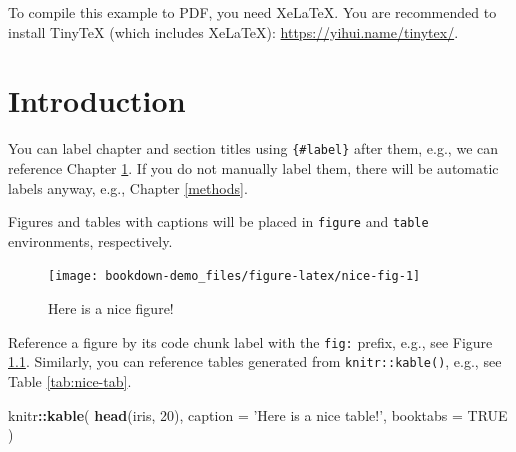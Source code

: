 \documentclass[]{book}
\newenvironment{Shaded}{\begin{snugshade}}{\end{snugshade}}
\newcommand{\DataTypeTok}[1]{\textcolor[rgb]{0.13,0.29,0.53}{#1}}
\newcommand{\DecValTok}[1]{\textcolor[rgb]{0.00,0.00,0.81}{#1}}
\newcommand{\KeywordTok}[1]{\textcolor[rgb]{0.13,0.29,0.53}{\textbf{#1}}}
\newcommand{\NormalTok}[1]{#1}
\newcommand{\OperatorTok}[1]{\textcolor[rgb]{0.81,0.36,0.00}{\textbf{#1}}}
\newcommand{\OtherTok}[1]{\textcolor[rgb]{0.56,0.35,0.01}{#1}}
\newcommand{\StringTok}[1]{\textcolor[rgb]{0.31,0.60,0.02}{#1}}
\begin{document}
To compile this example to PDF, you need XeLaTeX. You are recommended to install TinyTeX (which includes XeLaTeX): \url{https://yihui.name/tinytex/}.

\hypertarget{intro}{%
\chapter{Introduction}\label{intro}}

You can label chapter and section titles using \texttt{\{\#label\}} after them, e.g., we can reference Chapter \ref{intro}. If you do not manually label them, there will be automatic labels anyway, e.g., Chapter \ref{methods}.

Figures and tables with captions will be placed in \texttt{figure} and \texttt{table} environments, respectively.

\begin{figure}

{\centering \texttt{[image: bookdown-demo\_files/figure-latex/nice-fig-1]} 

}

\caption{Here is a nice figure!}\label{fig:nice-fig}
\end{figure}

Reference a figure by its code chunk label with the \texttt{fig:} prefix, e.g., see Figure \ref{fig:nice-fig}. Similarly, you can reference tables generated from \texttt{knitr::kable()}, e.g., see Table \ref{tab:nice-tab}.

\begin{Shaded}
\begin{Highlighting}[]
\NormalTok{knitr}\OperatorTok{::}\KeywordTok{kable}\NormalTok{(}
  \KeywordTok{head}\NormalTok{(iris, }\DecValTok{20}\NormalTok{), }\DataTypeTok{caption =} \StringTok{'Here is a nice table!'}\NormalTok{,}
  \DataTypeTok{booktabs =} \OtherTok{TRUE}
\NormalTok{)}
\end{Highlighting}
\end{Shaded}
\end{document}
